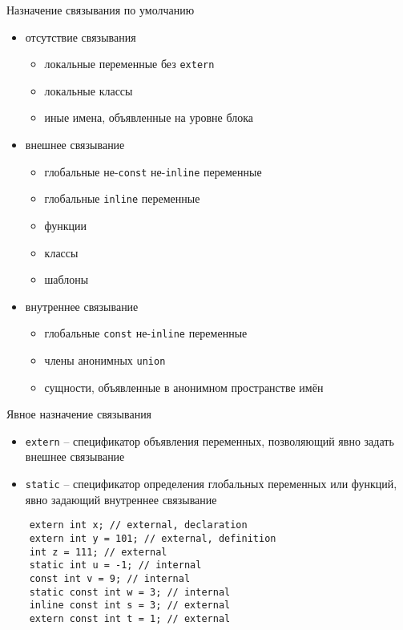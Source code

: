 \documentclass[unknownkeysallowed,xcolor=table]{beamer}
\begin{document}
\begin{frame}[fragile]{Назначение связывания по умолчанию}
  \begin{itemize}
    \item отсутствие связывания
      \begin{itemize}
        \item локальные переменные без \lstinline{extern}
        \item локальные классы
        \item иные имена, объявленные на уровне блока
      \end{itemize}
    \item внешнее связывание
      \begin{itemize}
        \item глобальные не-\lstinline{const} не-\lstinline{inline} переменные
        \item глобальные \lstinline{inline} переменные
        \item функции
        \item классы
        \item шаблоны
      \end{itemize}
    \item внутреннее связывание
      \begin{itemize}
        \item глобальные \lstinline{const} не-\lstinline{inline} переменные
        \item члены анонимных \lstinline{union}
        \item сущности, объявленные в анонимном пространстве имён
      \end{itemize}
  \end{itemize}
\end{frame}

\begin{frame}[fragile]{Явное назначение связывания}
  \begin{itemize}
    \item \lstinline{extern} -- спецификатор объявления переменных, позволяющий явно задать внешнее связывание \vspace{0.5em}
    \item \lstinline{static} -- спецификатор определения глобальных переменных или функций, явно задающий внутреннее связывание
  \end{itemize}
  \begin{lstlisting}
    extern int x; // external, declaration
    extern int y = 101; // external, definition
    int z = 111; // external
    static int u = -1; // internal
    const int v = 9; // internal
    static const int w = 3; // internal
    inline const int s = 3; // external
    extern const int t = 1; // external
  \end{lstlisting}
\end{frame}
\end{document}
